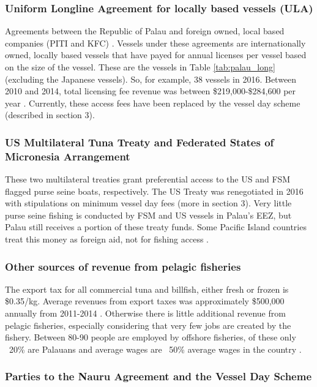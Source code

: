 \documentclass[11pt,english]{article}
\begin{document}
\subsubsection{Uniform Longline Agreement for locally based vessels (ULA)}
 
Agreements between the Republic of Palau and foreign owned, local based companies (PITI and KFC) \citep{Tewid2013}. Vessels under these agreements are internationally owned, locally based vessels that have payed for annual licenses per vessel based on the size of the vessel. These are the vessels in Table \ref{tab:palau_long} (excluding the Japanese vessels). So, for example, 38 vessels in 2016. Between 2010 and 2014, total licensing fee revenue was between \$219,000-\$284,600 per year \citep{Gillett2016}. Currently, these access fees have been replaced by the vessel day scheme (described in section 3).


\subsubsection{US Multilateral Tuna Treaty and Federated States of Micronesia Arrangement}

These two multilateral treaties grant preferential access to the US and FSM flagged purse seine boats, respectively.  The US Treaty was renegotiated in 2016 with stipulations on minimum vessel day fees (more in section 3). Very little purse seine fishing is conducted by FSM and US vessels in Palau’s EEZ, but Palau still receives a portion of these treaty funds. Some Pacific Island countries treat this money as foreign aid, not for fishing access \citep{Gillett2016}. 

\subsubsection{Other sources of revenue from pelagic fisheries}

The export tax for all commercial tuna and billfish, either fresh or frozen is \$0.35/kg. Average revenues from export taxes was approximately \$500,000 annually from 2011-2014 \citep{Gillett2016}. Otherwise there is little additional revenue from pelagic fisheries, especially considering that very few jobs are created by the fishery. Between 80-90 people are employed by offshore fisheries, of these only ~20\% are Palauans and average wages are ~50\% average wages in the country \citep{Gillett2016}.

\subsubsection{Parties to the Nauru Agreement and the Vessel Day Scheme}
\end{document}
